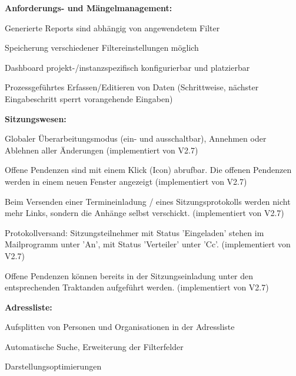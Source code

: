 \textbf{Anforderungs- und Mängelmanagement:}
\begin{compactitem}
	\item Generierte Reports sind abhängig von angewendetem Filter
	\item Speicherung verschiedener Filtereinstellungen möglich
	\item Dashboard projekt-/instanzspezifisch konfigurierbar und platzierbar
	\item Prozessgeführtes Erfassen/Editieren von Daten (Schrittweise, nächster Eingabeschritt sperrt vorangehende Eingaben)
\end{compactitem}

\textbf{Sitzungswesen:}
\begin{compactitem}
	\item Globaler Überarbeitungsmodus (ein- und ausschaltbar), Annehmen oder Ablehnen aller Änderungen (implementiert von V2.7)
	\item Offene Pendenzen sind  mit einem Klick (Icon) abrufbar. Die offenen Pendenzen werden in einem neuen Fenster angezeigt (implementiert von V2.7)
	\item Beim Versenden einer Termineinladung / eines Sitzungsprotokolls werden nicht mehr Links, sondern die Anhänge selbst verschickt. (implementiert von V2.7)
	\item Protokollversand: Sitzungsteilnehmer mit Status 'Eingeladen' stehen im Mailprogramm unter 'An', mit Status 'Verteiler' unter 'Cc'. (implementiert von V2.7)
	\item Offene Pendenzen können bereits in der Sitzungseinladung unter den entsprechenden Traktanden aufgeführt werden. (implementiert von V2.7)
\end{compactitem}

\textbf{Adressliste:}
\begin{compactitem}
	\item Aufsplitten von Personen und Organisationen in der Adressliste
	\item Automatische Suche, Erweiterung der Filterfelder
	\item Darstellungsoptimierungen
\end{compactitem}

\vspace{\baselineskip}

